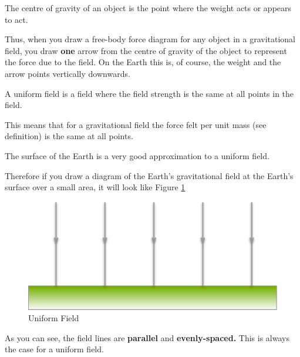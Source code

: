 \documentclass[main.tex]{subfiles}
\begin{document}

The centre of gravity of an object is the point where the weight acts or
appears to act.

Thus, when you draw a free-body force diagram for any object in a
gravitational field, you draw \textbf{one} arrow from the centre of
gravity of the object to represent the force due to the field. On the
Earth this is, of course, the weight and the arrow points vertically
downwards.


A uniform field is a field where the field strength is the same at all
points in the field.

This means that for a gravitational field the force felt per unit mass
(see definition) is the same at all points.

The surface of the Earth is a very good approximation to a uniform
field.

Therefore if you draw a diagram of the Earth's gravitational field at
the Earth's surface over a small area, it will look like Figure \ref{fig:uniform-field}

\begin{figure}[!h]
	\begin{center}
		\includegraphics[width=\textwidth]{figs/chapt-2/uniform-field.pdf}
	\end{center}
	\caption{Uniform Field}
	\label{fig:uniform-field}
\end{figure}

As you can see, the field lines are \textbf{parallel} and
\textbf{evenly-spaced.} This is always the case for a uniform field.

\end{document}

